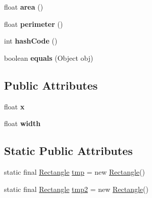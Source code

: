 \begin{DoxyCompactItemize}
\item 
\hypertarget{classairhockeyjava_1_1util_1_1_rectangle_a8e07b694887369fdd87315a832635415}{}float {\bfseries area} ()\label{classairhockeyjava_1_1util_1_1_rectangle_a8e07b694887369fdd87315a832635415}

\item 
\hypertarget{classairhockeyjava_1_1util_1_1_rectangle_ab79e9b54086e8ebbee43c7abadb4f5a7}{}float {\bfseries perimeter} ()\label{classairhockeyjava_1_1util_1_1_rectangle_ab79e9b54086e8ebbee43c7abadb4f5a7}

\item 
\hypertarget{classairhockeyjava_1_1util_1_1_rectangle_a84056fda8ab329e3c357420b16cae1dc}{}int {\bfseries hash\+Code} ()\label{classairhockeyjava_1_1util_1_1_rectangle_a84056fda8ab329e3c357420b16cae1dc}

\item 
\hypertarget{classairhockeyjava_1_1util_1_1_rectangle_ae00c8cdb81761cde91388c91c62e855b}{}boolean {\bfseries equals} (Object obj)\label{classairhockeyjava_1_1util_1_1_rectangle_ae00c8cdb81761cde91388c91c62e855b}

\end{DoxyCompactItemize}
\subsection*{Public Attributes}
\begin{DoxyCompactItemize}
\item 
\hypertarget{classairhockeyjava_1_1util_1_1_rectangle_a2ac2bee44c3fb9bd8cc3dae3971aff10}{}float {\bfseries x}\label{classairhockeyjava_1_1util_1_1_rectangle_a2ac2bee44c3fb9bd8cc3dae3971aff10}

\item 
\hypertarget{classairhockeyjava_1_1util_1_1_rectangle_a21958f7548b968bca1697c775b4c07c7}{}float {\bfseries width}\label{classairhockeyjava_1_1util_1_1_rectangle_a21958f7548b968bca1697c775b4c07c7}

\end{DoxyCompactItemize}
\subsection*{Static Public Attributes}
\begin{DoxyCompactItemize}
\item 
static final \hyperlink{classairhockeyjava_1_1util_1_1_rectangle}{Rectangle} \hyperlink{classairhockeyjava_1_1util_1_1_rectangle_a8a5bfd6702247244fb903bac0561f9ff}{tmp} = new \hyperlink{classairhockeyjava_1_1util_1_1_rectangle}{Rectangle}()
\item 
static final \hyperlink{classairhockeyjava_1_1util_1_1_rectangle}{Rectangle} \hyperlink{classairhockeyjava_1_1util_1_1_rectangle_a33dc20bc1292f651c0a730155f700cdf}{tmp2} = new \hyperlink{classairhockeyjava_1_1util_1_1_rectangle}{Rectangle}()
\end{DoxyCompactItemize}


